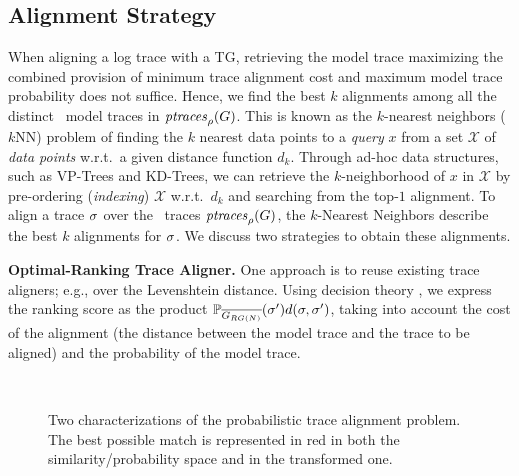 
\subsection{Alignment Strategy}\label{subsec:as}
When aligning a log trace with a TG, retrieving the model trace maximizing the combined provision of minimum trace alignment cost 
and maximum model trace probability does not suffice.
Hence, we find the best $k$ alignments among all the distinct \unravelled\ model traces in $\mathit{ptraces}_{\rho}(G)$. This is
known as the $k$-nearest neighbors ($k$NN) problem of finding the $k$ nearest data points to a \textit{query} $x$ from a set 
$\mathcal{X}$ of \textit{data points} w.r.t.\ a given distance function $d_k$. Through ad-hoc data structures, such as VP-Trees 
and KD-Trees, %
we can retrieve the $k$-neighborhood of $x$ in $\mathcal{X}$ by pre-ordering (\textit{indexing}) $\mathcal{X}$ w.r.t.\ $d_k$ 
and searching from the top-$1$ alignment.
%
To align a trace $\sigma$ over the \unravelled\ traces $\mathit{ptraces}_{\rho}(G)$,
the $k$-Nearest Neighbors describe the best $k$ alignments for $\sigma$. We discuss two strategies to obtain these
alignments.

\noindent
\textbf{Optimal-Ranking Trace Aligner.}
One approach is to reuse existing trace aligners; e.g., \cite{DBLP:conf/edoc/AdriansyahDA11,LeoniM17} over the Levenshtein 
distance.
Using decision theory \cite{dectheor}, we express the ranking score as the product 
$\mathbb{P}_{\overline{G_{RG(N)}}}({\sigma'}) d(\sigma,{\sigma'})$, taking into account the cost of the alignment (the distance between 
the model trace and the trace to be aligned) and the probability of the model trace.

\begin{figure}[!t]
	\centering
	\qquad
	\\
	\caption{Two characterizations of the probabilistic trace alignment problem. The best possible match is represented in red in both the similarity/probability space and in the transformed one.}
\end{figure}

